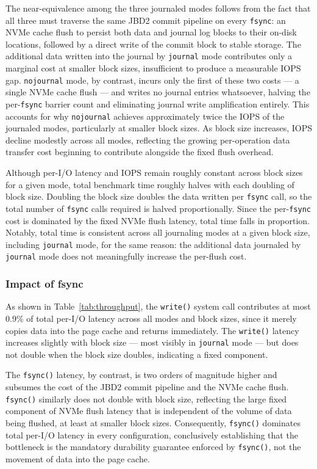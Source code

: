 \documentclass[12pt,a4paper]{article}
\begin{document}
The near-equivalence among the three journaled modes follows from the fact that all
three must traverse the same JBD2 commit pipeline on every \texttt{fsync}: an NVMe
cache flush to persist both data and journal log blocks to their on-disk locations,
followed by a direct write of the commit block to stable storage. The additional data
written into the journal by \texttt{journal} mode contributes only a marginal cost at
smaller block sizes, insufficient to produce a measurable IOPS gap. \texttt{nojournal}
mode, by contrast, incurs only the first of these two costs --- a single NVMe cache
flush --- and writes no journal entries whatsoever, halving the per-\texttt{fsync}
barrier count and eliminating journal write amplification entirely. This accounts for
why \texttt{nojournal} achieves approximately twice the IOPS of the journaled modes,
particularly at smaller block sizes. As block size increases, IOPS decline modestly
across all modes, reflecting the growing per-operation data transfer cost beginning to
contribute alongside the fixed flush overhead.

Although per-I/O latency and IOPS remain roughly constant across block sizes for a
given mode, total benchmark time roughly halves with each doubling of block size.
Doubling the block size doubles the data written per \texttt{fsync} call, so the
total number of \texttt{fsync} calls required is halved proportionally. Since the
per-\texttt{fsync} cost is dominated by the fixed NVMe flush latency, total time falls
in proportion. Notably, total time is consistent across all journaling modes at a given
block size, including \texttt{journal} mode, for the same reason: the additional data
journaled by \texttt{journal} mode does not meaningfully increase the per-flush cost.

\subsubsection{Impact of fsync}
As shown in Table~\ref{tab:throughput}, the \texttt{write()} system call contributes at
most 0.9\% of total per-I/O latency across all modes and block sizes, since it
merely copies data into the page cache and returns immediately. The \texttt{write()}
latency increases slightly with block size --- most visibly in \texttt{journal} mode
--- but does not double when the block size doubles, indicating a fixed component.

The \texttt{fsync()} latency, by contrast, is two orders of magnitude higher and
subsumes the cost of the JBD2 commit pipeline and the NVMe cache flush.
\texttt{fsync()} similarly does not double with block size, reflecting the large fixed
component of NVMe flush latency that is independent of the volume of data being
flushed, at least at smaller block sizes. Consequently, \texttt{fsync()} dominates
total per-I/O latency in every configuration, conclusively establishing that the
bottleneck is the mandatory durability guarantee enforced by \texttt{fsync()}, not
the movement of data into the page cache.
\end{document}
